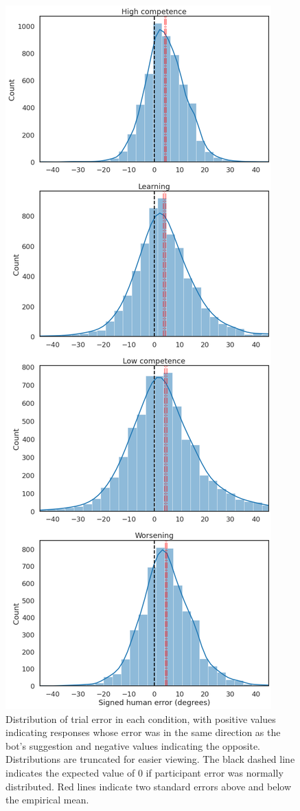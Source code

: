 \documentclass[10pt,letterpaper]{article}
\begin{document}
\begin{figure}[H]
\begin{center}
\includegraphics[width=.75\linewidth]{img/results-error_histograms.png}
\end{center}
\caption{Distribution of trial error in each condition, with positive values indicating responses whose error was in the same direction as the bot's suggestion and negative values indicating the opposite. Distributions are truncated for easier viewing. The black dashed line indicates the expected value of 0 if participant error was normally distributed. Red lines indicate two standard errors above and below the empirical mean.} 
\label{fig:error_histograms}
\end{figure}
\end{document}
